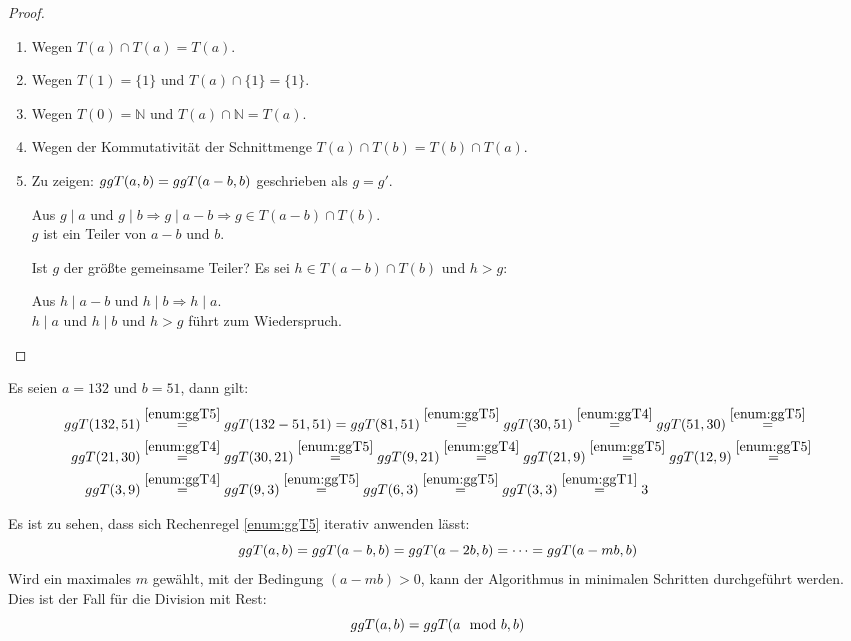 \begin{proof}\mbox{}
  \begin{enumerate}
    \item Wegen $T(a) \cap T(a) = T(a)$.
    \item Wegen $T(1) = \{1\}$ und $T(a) \cap \{1\} = \{1\}$.
    \item Wegen $T(0) = \mathbb{N}$ und $T(a) \cap \mathbb{N} = T(a)$.
    \item Wegen der Kommutativität der Schnittmenge $T(a) \cap T(b) = T(b)\cap T(a)$.
    \item Zu zeigen: $ggT(a,b) = ggT(a - b,b)$ geschrieben als $g = g'$.
          \begin{center}
            Aus $g \mid a$ und $g \mid b \Rightarrow g \mid a-b \Rightarrow g \in T(a-b) \cap T(b)$.\\
            $g$ ist ein Teiler von $a-b$ und $b$.
          \end{center}
          Ist $g$ der größte gemeinsame Teiler?
          Es sei $h \in T(a-b) \cap T(b)$ und $h > g$:
          \begin{center}
            Aus $h \mid a-b$ und $h \mid b \Rightarrow h \mid a$.\\
            $h \mid a$ und $h \mid b$ und $h > g$ führt zum Wiederspruch.
          \end{center}
  \end{enumerate}
\end{proof}

\begin{example}
  Es seien $a=132$ und $b=51$, dann gilt:
  \begin{align*}
    ggT(132,51) & \stackrel{\ref{enum:ggT5}}{=} ggT(132 - 51,51) =
    ggT(81,51) \stackrel{\ref{enum:ggT5}}{=} ggT(30,51) \stackrel{\ref{enum:ggT4}}{=}
    ggT(51,30) \stackrel{\ref{enum:ggT5}}{=}                                          \\
    ggT(21,30)  & \stackrel{\ref{enum:ggT4}}{=}  ggT(30,21) \stackrel{\ref{enum:ggT5}}{=}
    ggT(9,21) \stackrel{\ref{enum:ggT4}}{=}
    ggT(21,9) \stackrel{\ref{enum:ggT5}}{=} ggT(12,9) \stackrel{\ref{enum:ggT5}}{=}       \\
    ggT(3,9)    & \stackrel{\ref{enum:ggT4}}{=} ggT(9,3) \stackrel{\ref{enum:ggT5}}{=}
    ggT(6,3) \stackrel{\ref{enum:ggT5}}{=} ggT(3,3) \stackrel{\ref{enum:ggT1}}{=} 3 \qedhere
  \end{align*}
\end{example}

\noindent
Es ist zu sehen, dass sich Rechenregel \ref{enum:ggT5} iterativ anwenden lässt:
\begin{equation*}
  ggT(a,b) = ggT(a-b,b) = ggT(a-2b,b) = \dots = ggT(a-mb,b)
\end{equation*}
Wird ein maximales $m$ gewählt, mit der Bedingung $(a-mb) > 0$, kann der Algorithmus
in minimalen Schritten durchgeführt werden. Dies ist der Fall für die Division mit Rest:
\begin{equation*}
  ggT(a,b) = ggT(a \mod{b},b)
\end{equation*}

